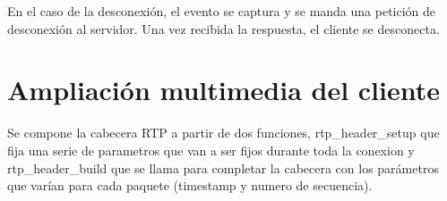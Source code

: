 \documentclass{mathnotes}
\begin{document}
En el caso de la desconexión, el evento se captura y se manda una petición de desconexión al servidor. Una vez recibida la respuesta, el cliente se desconecta.

\section{Ampliación multimedia del cliente}
Se compone la cabecera RTP a partir de dos funciones, rtp_header_setup que fija una serie de parametros que van a ser fijos durante toda la conexion y rtp_header_build que se llama para completar la cabecera con los parámetros que varían para cada paquete (timestamp y numero de secuencia).
\end{document}
